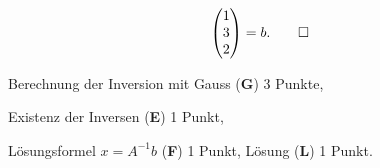 \begin{loesung}
\begin{teilaufgaben}
\[\begin{pmatrix}
1\\3\\2
\end{pmatrix}=b.
\qedhere
\]
\end{teilaufgaben}
\end{loesung}

\begin{bewertung}
\begin{teilaufgaben}
\item
Berechnung der Inversion mit Gauss ({\bf G}) 3 Punkte,
\item
Existenz der Inversen ({\bf E}) 1 Punkt,
\item
Lösungsformel $x=A^{-1}b$ ({\bf F}) 1 Punkt,
Lösung ({\bf L}) 1 Punkt.
\end{teilaufgaben}
\end{bewertung}
